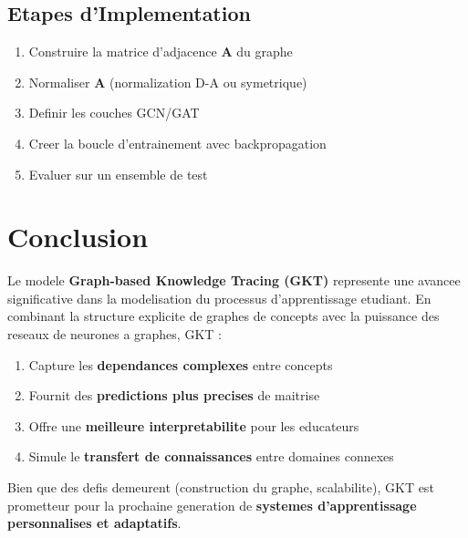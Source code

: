 \documentclass[11pt, a4paper]{article}
\begin{document}
\subsection{Etapes d'Implementation}

\begin{enumerate}
    \item Construire la matrice d'adjacence $\mathbf{A}$ du graphe
    \item Normaliser $\mathbf{A}$ (normalization D-A ou symetrique)
    \item Definir les couches GCN/GAT
    \item Creer la boucle d'entrainement avec backpropagation
    \item Evaluer sur un ensemble de test
\end{enumerate}

\section{Conclusion}

Le modele \textbf{Graph-based Knowledge Tracing (GKT)} represente une avancee significative dans la modelisation du processus d'apprentissage etudiant. En combinant la structure explicite de graphes de concepts avec la puissance des reseaux de neurones a graphes, GKT :

\begin{enumerate}
    \item Capture les \textbf{dependances complexes} entre concepts
    \item Fournit des \textbf{predictions plus precises} de maitrise
    \item Offre une \textbf{meilleure interpretabilite} pour les educateurs
    \item Simule le \textbf{transfert de connaissances} entre domaines connexes
\end{enumerate}

Bien que des defis demeurent (construction du graphe, scalabilite), GKT est prometteur pour la prochaine generation de \textbf{systemes d'apprentissage personnalises et adaptatifs}.
\end{document}
